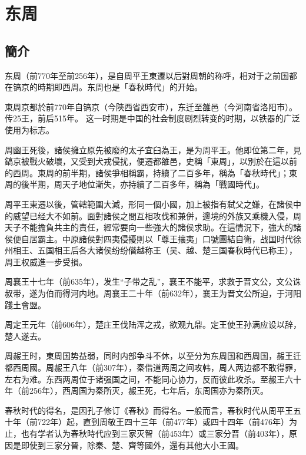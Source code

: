 
\section{东周}

\subsection{簡介}

东周（前770年至前256年），是自周平王東遷以后對周朝的称呼，相对于之前国都在镐京的時期即西周。东周也是「春秋時代」的开始。

東周京都於前770年自镐京（今陝西省西安市），东迁至雒邑（今河南省洛阳市）。传25王，前后515年。 这一时期是中国的社会制度剧烈转变的时期，以铁器的广泛使用为标志。

周幽王死後，諸侯擁立原先被廢的太子宜臼為王，是为周平王。他即位第二年，見鎬京被戰火破壞，又受到犬戎侵扰，便遷都雒邑，史稱「東周」，以別於在這以前的西周。東周的前半期，諸侯爭相稱霸，持續了二百多年，稱為「春秋時代」；東周的後半期，周天子地位漸失，亦持續了二百多年，稱為「戰國時代」。

周平王東遷以後，管轄範圍大減，形同一個小國，加上被指有弑父之嫌，在諸侯中的威望已经大不如前。面對諸侯之間互相攻伐和兼併，邊境的外族又乘機入侵，周天子不能擔負共主的責任，經常要向一些強大的諸侯求助。在這情況下，強大的諸侯便自居霸主。中原諸侯對四夷侵擾則以「尊王攘夷」口號團結自衛，战国时代徐州相王、五国相王后各大诸侯纷纷僭越称王（吴、越、楚三国春秋時代已称王），周王权威進一步受損。

周襄王十七年（前635年），发生“子带之乱”，襄王不能平，求救于晋文公，文公诛叔带，遂为伯而得河内地。周襄王二十年（前632年），襄王为晋文公所迫，于河阳踐土會盟。

周定王元年（前606年），楚庄王伐陆浑之戎，欲观九鼎。定王使王孙满应设以辞，楚人遂去。

周赧王时，東周国势益弱，同时内部争斗不休，以至分为东周国和西周国，赧王迁都西周國。周赧王八年（前307年），秦借道两周之间攻韩，周人两边都不敢得罪，左右为难。东西两周位于诸强国之间，不能同心协力，反而彼此攻杀。至赧王六十年（前256年），西周国为秦所灭，赧王死，七年后，东周国亦为秦所灭。

春秋时代的得名，是因孔子修订《春秋》而得名。一般而言，春秋时代从周平王五十年（前722年）起，直到周敬王四十三年（前477年）或四十四年（前476年）为止，也有学者认为春秋時代应到三家灭智（前453年）或三家分晋（前403年），原因是即使到三家分晉，除秦、楚、齊等國外，還有其他大小王國。

